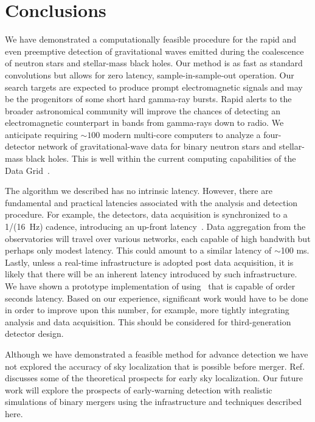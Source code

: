 \section{Conclusions}
\label{SECV}\label{sec:conclusions}

We have demonstrated a computationally feasible procedure for the rapid and even preemptive
detection of gravitational waves emitted during the coalescence of neutron
stars and stellar-mass black holes. Our method is as fast as standard \fft{}
convolutions but allows for zero latency, sample-in-sample-out operation.
Our search targets are expected to
produce prompt electromagnetic signals and may be the progenitors of some short
hard gamma-ray bursts.  Rapid alerts to the broader astronomical community will
improve the chances of detecting an electromagnetic counterpart in bands from
gamma-rays down to radio.  We anticipate requiring $\sim100$ modern
multi-core computers to analyze a four-detector network of gravitational-wave data
for binary neutron stars and stellar-mass black holes.  This is well within the
current computing capabilities of the \LIGO{} Data Grid~\cite{LDG}.

The algorithm we described has no intrinsic latency.  However, there are
fundamental and practical latencies associated with the analysis and detection
procedure. For example, the \LIGO{} detectors, data acquisition is synchronized
to a 1/(16~Hz) cadence, introducing an up-front latency~\cite{CITE_CDS}. Data
aggregation from
the observatories will travel over various networks, each capable of high
bandwith but perhaps only modest latency.  This could amount to a similar
latency of $\sim$100 ms.  Lastly, unless a real-time infrastructure is adopted
post data acquisition, it is likely that there will be an inherent latency
introduced by such infrastructure.  We have shown a prototype implementation
of \lloid{} using \gstlal\ that is capable of order seconds latency. Based
on our experience, significant work would have to be done in order to improve
upon this number, for example, more tightly integrating analysis and data
acquisition. This should be considered for third-generation detector design.

Although we have demonstrated a feasible method for advance detection we have
not explored the accuracy of sky localization that is possible before merger.
Ref.~\cite{Fairhurst2009} discusses some of the theoretical prospects for early sky
localization.  Our future work will explore the prospects of early-warning
detection with realistic simulations of binary mergers using the infrastructure
and techniques described here. 


